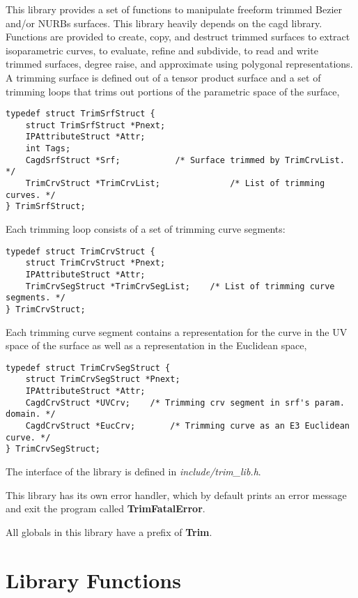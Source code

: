 {This library provides a set of functions to manipulate freeform
trimmed Bezier and/or NURBs surfaces. This library heavily depends on
the cagd library. Functions are provided to create, copy, and destruct
trimmed surfaces to extract isoparametric curves, to evaluate, refine
and subdivide, to read and write trimmed surfaces, degree raise, and
approximate using polygonal representations.  A trimming surface is
defined out of a tensor product surface and a set of trimming loops
that trims out portions of the parametric space of the surface,
\begin{verbatim}
typedef struct TrimSrfStruct {
    struct TrimSrfStruct *Pnext;
    IPAttributeStruct *Attr;
    int Tags;
    CagdSrfStruct *Srf;			  /* Surface trimmed by TrimCrvList. */
    TrimCrvStruct *TrimCrvList;		         /* List of trimming curves. */
} TrimSrfStruct;
\end{verbatim}

Each trimming loop consists of a set of trimming curve segments:
\begin{verbatim}
typedef struct TrimCrvStruct {
    struct TrimCrvStruct *Pnext;
    IPAttributeStruct *Attr;
    TrimCrvSegStruct *TrimCrvSegList;    /* List of trimming curve segments. */
} TrimCrvStruct;
\end{verbatim}

Each trimming curve segment contains a representation for the curve in the
UV space of the surface as well as a representation in the Euclidean space,
\begin{verbatim}
typedef struct TrimCrvSegStruct {
    struct TrimCrvSegStruct *Pnext;
    IPAttributeStruct *Attr;
    CagdCrvStruct *UVCrv;    /* Trimming crv segment in srf's param. domain. */
    CagdCrvStruct *EucCrv;       /* Trimming curve as an E3 Euclidean curve. */
} TrimCrvSegStruct;
\end{verbatim}


The interface of the library is defined in {\em include/trim\_lib.h}. 

This library has its own error handler, which by default prints an
error message and exit the program called {\bf TrimFatalError}.

All globals in this library have a prefix of {\bf Trim}.

\section{Library Functions}


}
